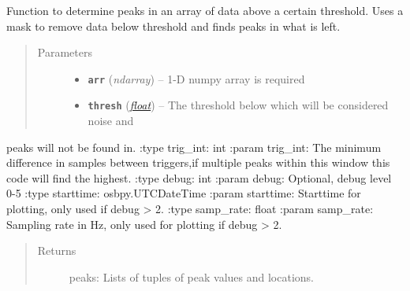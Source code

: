 \documentclass[a4paper,10pt,english]{sphinxmanual}
\begin{document}
\begin{fulllineitems}
\label{submodules/utils.findpeaks:findpeaks.find_peaks2_short}
Function to determine peaks in an array of data above a certain threshold. Uses a mask to remove data below threshold and finds peaks in what is left.
\begin{quote}\begin{description}
\item[{Parameters}] \leavevmode\begin{itemize}
\item {} 
\textbf{\texttt{arr}} (\emph{ndarray}) -- 1-D numpy array is required

\item {} 
\textbf{\texttt{thresh}} (\href{https://docs.python.org/library/functions.html\#float}{\emph{float}}) -- The threshold below which will be considered noise and 

\end{itemize}

\end{description}\end{quote}

peaks will not be found in.
:type trig\_int: int
:param trig\_int: The minimum difference in samples between triggers,if multiple peaks within this window this code will find the highest.
:type debug: int
:param debug: Optional, debug level 0-5
:type starttime: osbpy.UTCDateTime
:param starttime: Starttime for plotting, only used if debug \textgreater{} 2.
:type samp\_rate: float
:param samp\_rate: Sampling rate in Hz, only used for plotting if debug \textgreater{} 2.
\begin{quote}\begin{description}
\item[{Returns}] \leavevmode
peaks: Lists of tuples of peak values and locations.

\end{description}\end{quote}

\end{fulllineitems}

\end{document}
